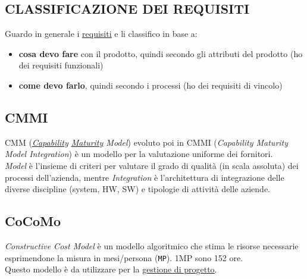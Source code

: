 		\subsection{CLASSIFICAZIONE DEI REQUISITI}  \label{classificazione}
		Guardo in generale i \underline{\hyperref[requirements]{requisiti}} e li classifico in base a:
		\begin{itemize}
			\item \textbf{cosa devo fare} con il prodotto, quindi secondo gli attributi del prodotto (ho dei requisiti funzionali)
			\item \textbf{come devo farlo}, quindi secondo i processi (ho dei requisiti di vincolo)
		\end{itemize}

		\subsection{CMMI}	 \label{cmmi} %
		CMM (\textit{\underline{\hyperref[capability]{Capability}} \underline{\hyperref[maturita]{Maturity}} Model}) evoluto poi in CMMI (\textit{Capability Maturity Model Integration}) è un modello per la valutazione uniforme dei fornitori. \\
		\textit{Model} è l'insieme di criteri per valutare il grado di qualità (in scala assoluta) dei processi dell’azienda, mentre \textit{Integration} è l'architettura di integrazione delle diverse discipline (system, HW, SW) e tipologie di attività delle aziende.

		\subsection{CoCoMo}	 \label{cocomo}
		\textit{Constructive Cost Model} è un modello algoritmico che stima le risorse necessarie esprimendone la misura in mesi/persona (\texttt{MP}). 1MP sono 152 ore. \\
		Questo modello è da utilizzare per la \underline{\hyperref[gestioneprogetto]{gestione di progetto}}.

